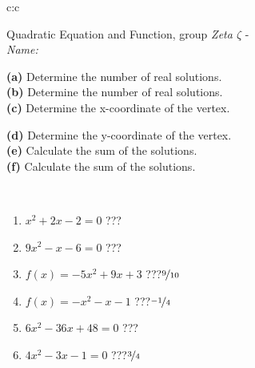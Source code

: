 \documentclass[10pt]{report}
\begin{document}
\begin{tabular}{c:c}
\begin{minipage}[c][104.5mm][t]{0.5\linewidth}
\begin{center}
\vspace{7mm}
{\huge {\LARGE Quadratic Equation and Function}, group \textit{Zeta $\zeta$} -}\\[5mm]
\textit{Name:}\phantom{xxxxxxxxxxxxxxxxxxxxxxxxxxxxxxxxxxxxxxxxxxxxxxxxxxxxxxxxxxxxxxxxx}\\[5mm]
\begin{minipage}{0.95\linewidth}
\begin{center}
{\small \begin{minipage}{0.5\textwidth}
\textbf{(a)} Determine the number of real solutions. \\[1mm]
\textbf{(b)} Determine the number of real solutions. \\[1mm]
\textbf{(c)} Determine the x-coordinate of the vertex.
\end{minipage} \begin{minipage}{0.49\textwidth}
\textbf{(d)} Determine the y-coordinate of the vertex. \\[1mm]
\textbf{(e)} Calculate the sum of the solutions. \\[1mm]
\textbf{(f)} Calculate the sum of the solutions.
\end{minipage}
}
\end{center}
\end{minipage}
\\[4mm]
\begin{minipage}{0.79\linewidth}
\begin{center}
\begin{varwidth}{\linewidth}
\begin{enumerate}
\Large
\item $x^2+2x-2=0$\quad \dotfill\; ???\;\dotfill {}
\item $9x^2-x-6=0$\quad \dotfill\; ???\;\dotfill {}
\item $f(x)=-5x^2+9x+3$\quad \dotfill\; ???\;\dotfill \quad $\nicefrac{9}{10}$
\item $f(x)=-x^2-x-1$\quad \dotfill\; ???\;\dotfill \quad $\nicefrac{-1}{4}$
\item $6x^2-36x+48=0$\quad \dotfill\; ???\;\dotfill {}
\item $4x^2-3x-1=0$\quad \dotfill\; ???\;\dotfill \quad $\nicefrac{3}{4}$
\end{enumerate}
\end{varwidth}

\end{center}
\end{minipage}
\end{center}
\end{minipage}
\end{tabular}
\end{document}
